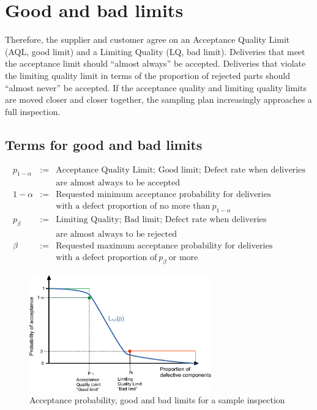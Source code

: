 \documentclass[a4paper,11pt,oneside]{article}
\begin{document}
\section{Good and bad limits}

Therefore, the supplier and customer agree on an Acceptance Quality Limit (AQL, good limit) and a Limiting Quality (LQ, bad limit). Deliveries that meet the acceptance limit should ``almost always'' be accepted. Deliveries that violate the limiting quality limit in terms of the proportion of rejected parts should ``almost never'' be accepted. If the acceptance quality and limiting quality limits are moved closer and closer together, the sampling plan increasingly approaches a full inspection.

\subsection*{Terms for good and bad limits}

\begin{eqnarray*}
p_{1-\alpha}&:=&\text{Acceptance Quality Limit; Good limit; Defect rate when deliveries}\\
~&~&\text{are almost always to be accepted}\\[2ex]
1-\alpha&:=&\text{Requested minimum acceptance probability for deliveries}\\
~&~&\text{with a defect proportion of no more than}~ p_{1-\alpha}\\[2ex]
p_\beta&:=&\text{Limiting Quality; Bad limit; Defect rate when deliveries}\\
~&~&\text{are almost always to be rejected}\\[2ex]
\beta&:=&\text{Requested maximum acceptance probability for deliveries}\\
~&~&\text{with a defect proportion of}~ p_{\beta} ~\text{or more}
\end{eqnarray*}

\begin{figure}[H]
\begin{center}
\includegraphics[width=0.7\textwidth]{OperationCharacteristics_en.pdf}
\end{center}
\caption{Acceptance probability, good and bad limits for a sample inspection}
\label{fig:L}
\end{figure}
\end{document}

